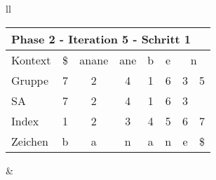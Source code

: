\begin{table}[H]

\centering
\begin{adjustbox}{max width=\textwidth}
\begin{tabular}{ll}

\begin{tabular}{lccccccc}
\multicolumn{8}{l}{Phase 2 - Iteration 5 - Schritt 1}                                                                                                                                                             \\ \hline
\multicolumn{1}{l|}{Kontext} & \multicolumn{1}{c|}{\$} & \multicolumn{1}{c|}{anane} & \multicolumn{1}{c|}{ane} & \multicolumn{1}{c|}{b} & \multicolumn{1}{c|}{\cellcolor[HTML]{\green}e} & \multicolumn{2}{c}{n} \\
\multicolumn{1}{l|}{Gruppe}  & \multicolumn{1}{c|}{7}  & \multicolumn{1}{c|}{2}     & \multicolumn{1}{c|}{4}   & \multicolumn{1}{c|}{1} & \multicolumn{1}{c|}{\cellcolor[HTML]{\green}6} & 3         & 5          \\
\multicolumn{1}{l|}{SA}      & \multicolumn{1}{c|}{7}  & \multicolumn{1}{c|}{2}     & \multicolumn{1}{c|}{4}   & \multicolumn{1}{c|}{1} & \multicolumn{1}{c|}{\cellcolor[HTML]{\green}6} & 3         &            \\ \hline
\multicolumn{1}{l|}{Index}   & 1                       & 2                          & 3                        & 4                      & 5                                              & 6         & 7          \\
\multicolumn{1}{l|}{Zeichen} & b                       & a                          & n                        & a                      & n                                              & e         & \$        
\end{tabular}

&


\end{tabular}
\end{adjustbox}
\end{table}
